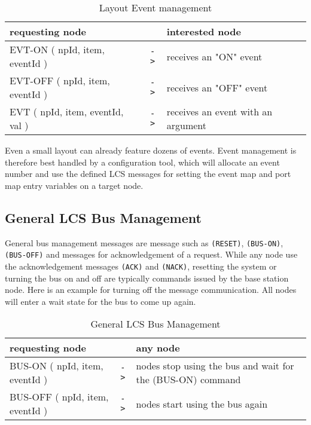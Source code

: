 \begin{table}[ht!]
    \begin{center}
        \caption{Layout Event management}
        \begin{tabular}{|p{}| c |p{}|}
            \toprule
            \textbf{requesting node} & & \textbf{ interested node} \\
            \midrule
            EVT-ON ( npId, item, eventId ) & \texttt{->} & receives an "ON" event \\
            EVT-OFF ( npId, item, eventId ) & \texttt{->} & receives an "OFF" event \\
            \midrule
            EVT ( npId, item, eventId, val ) & \texttt{->} & receives an event with an argument \\
            \bottomrule
        \end{tabular}
    \end{center}
\end{table}

Even a small layout can already feature dozens of events. Event management is therefore best handled by a configuration tool, which will allocate an event number and use the defined LCS messages for setting the event map and port map entry variables on a target node.

\subsection{General LCS Bus Management}

General bus management messages are message such as \texttt{(RESET)}, \texttt{(BUS-ON)}, \texttt{(BUS-OFF)} and messages for acknowledgement of a request. While any node use the acknowledgement messages \texttt{(ACK)} and \texttt{(NACK)}, resetting the system or turning the bus on and off are typically commands issued by the base station node. Here is an example for turning off the message communication. All nodes will enter a wait state for the bus to come up again.

\begin{table}[ht!]
    \begin{center}
        \caption{General LCS Bus Management}
        \begin{tabular}{|p{}| c |p{}|}
            \toprule
            \textbf{requesting node} & & \textbf{ any node} \\
            \midrule
            BUS-ON ( npId, item, eventId ) & \texttt{->} & nodes stop using the bus and wait for the (BUS-ON) command  \\
            \midrule
            BUS-OFF ( npId, item, eventId ) & \texttt{->} & nodes start using the bus again \\
            \bottomrule
        \end{tabular}
    \end{center}
\end{table}

